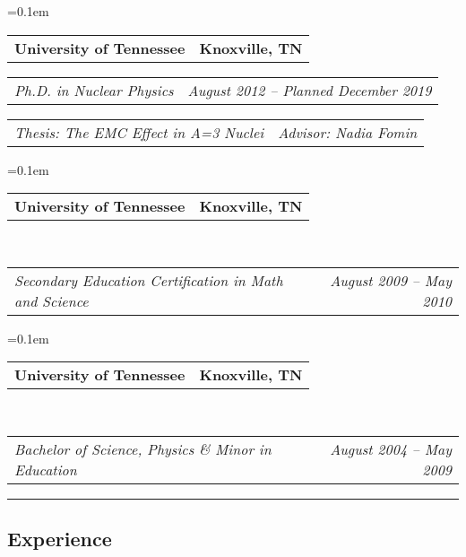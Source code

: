 \documentclass[12pt,letterpaper]{article}
\makeatletter
\newcommand{\headerrow}[2]
{\begin{tabular*}{\linewidth}{l@{\extracolsep{\fill}}r}
	#1 &
	#2 \\
\end{tabular*}}
\makeatother
\begin{document}
\begin{itemize*}
	\parskip=0.1em
	
	\item 
	\headerrow
	{\textbf{University of Tennessee}}
	{\textbf{Knoxville, TN}}
	
	\headerrow
	{\emph{Ph.D. in Nuclear Physics}}
	{\emph{August 2012 -- Planned December 2019}}
		\headerrow
	{\emph{Thesis: The EMC Effect in A=3 Nuclei}}
	{\emph{Advisor: Nadia Fomin}}
	
	
	\parskip=0.1em
	
	\item 
	\headerrow
	{\textbf{University of Tennessee}}
	{\textbf{Knoxville, TN}}
	\\
	\headerrow
	{\emph{Secondary Education Certification in Math and Science}}
	{\emph{August 2009 -- May 2010}}
	
	
	\parskip=0.1em
	
	\item 
	\headerrow
	{\textbf{University of Tennessee}}
	{\textbf{Knoxville, TN}}
	\\
	\headerrow
	{\emph{Bachelor of Science, Physics \& Minor in Education }}
	{\emph{August 2004 -- May 2009}}
	
	
\end{itemize*}
\hrule
\vspace{-0.4em}
\subsection*{Experience}
\end{document}
